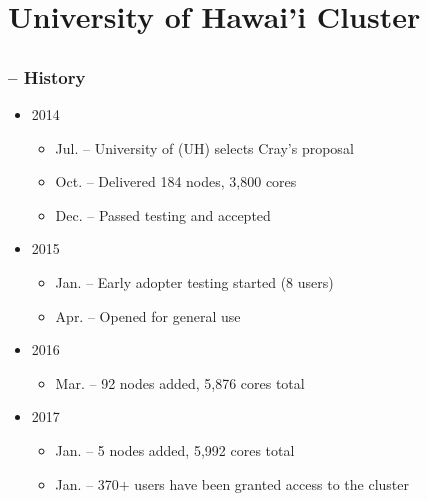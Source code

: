 \section{University of Hawai'i Cluster}

\subsection{{\craycs}}
\begin{frame}
\frametitle{{\craycs} -- History}
\begin{itemize}
\item[] 2014
  \begin{itemize}
  \item Jul. -- University of {\hawaii} (UH) selects Cray's proposal
  \item Oct. -- Delivered 184 nodes, 3,800 cores
  \item Dec. -- Passed testing and accepted
  \end{itemize}

\item[] 2015
  \begin{itemize}
  \item Jan. -- Early adopter testing started (8 users)
  \item Apr. -- Opened for general use
  \end{itemize}
\item[] 2016
  \begin{itemize}
  \item Mar. -- 92 nodes added, 5,876 cores total
  \end{itemize}
\item[] 2017
  \begin{itemize}
  \item Jan. -- 5 nodes added, 5,992 cores total
  \item Jan. -- 370$+$ users have been granted access to the cluster
  \end{itemize}
\end{itemize}
\end{frame}


